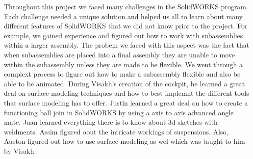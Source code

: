 Throughout this project we faced many challenges in the SolidWORKS program.  Each challenge needed a unique solution and helped us all to learn about many different features of SolidWORKS that we did not know prior to the project.  For example, we gained experience and figured out how to work with subassemblies within a larger assembly.  The probem we faced with this aspect was the fact that when subassemblies are placed into a final assembly they are unable to move within the subassembly unless they are made to be flexible.  We went through a complext process to figure out how to make a subassembly flexible and also be able to be animated.  During Visakh's creation of the cockpit, he learned a great deal on surface modeling techniques and how to best implemnt the different tools that surface modeling has to offer.  Justin learned a great deal on how to create a functioning ball join in SolidWORKS by using a axis to axis advanced angle mate.  Juan learned everything there is to know about 3d sketches with weldments.  Assim figured oout the intricate workings of suspensions.  Also, Auston figured out how to use surface modeling as wel which was taught to him by Visakh.
